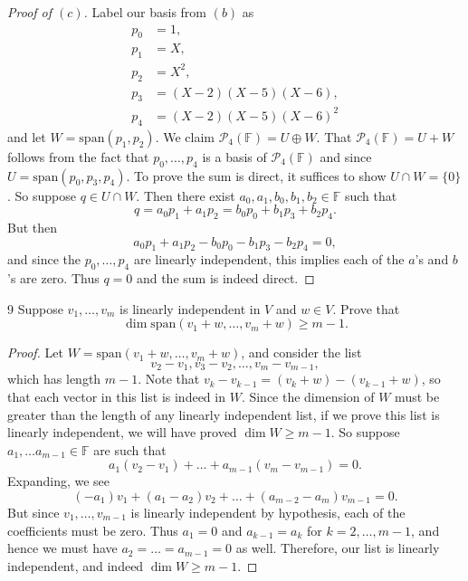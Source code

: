 \documentclass{extarticle}
\newenvironment{problem}[1]{\begin{prob*}{#1}{}}{\end{prob*}}
\newcommand{\F}{\mathbb{F}}
\newcommand{\Span}{\mathrm{span}}
\begin{document}
\begin{proof}[Proof of $(c)$]
Label our basis from $(b)$ as
\begin{align*}
p_0 &= 1, \\ p_1 &= X,\\ p_2 &= X^2,\\ p_3 &= (X - 2)(X-5)(X-6), \\ p_4 &= (X-2)(X-5)(X-6)^2
\end{align*}
and let $W = \Span(p_1, p_2)$.  We claim $\mathcal{P}_4(\F) = U\oplus W$.  That $\mathcal{P}_4(\F) = U + W$ follows from the fact that $p_0,\dots, p_4$ is a basis of $\mathcal{P}_4(\F)$ and since $U = \Span(p_0, p_3, p_4)$.  To prove the sum is direct, it suffices to show $U\cap W=\{0\}$.  So suppose $q\in U\cap W$.  Then there exist $a_0, a_1, b_0, b_1, b_2\in\F$ such that 
\begin{equation*}
q = a_0p_1 + a_1 p_2 = b_0p_0 + b_1 p_3 + b_2 p_4.
\end{equation*}
But then
\begin{equation*}
a_0p_1 + a_1 p_2 - b_0p_0 - b_1 p_3 - b_2 p_4 = 0,
\end{equation*}
and since the $p_0,\dots,p_4$ are linearly independent, this implies each of the $a$'s and $b$'s are zero.  Thus $q=0$ and the sum is indeed direct.
\end{proof}

\begin{problem}{9}
Suppose $v_1,\dots, v_m$ is linearly independent in $V$ and $w\in V$.  Prove that 
\begin{equation*}
\dim\Span(v_1 + w, \dots, v_m + w)\geq m - 1.
\end{equation*}
\end{problem}
\begin{proof}
Let $W = \Span(v_1 + w, \dots, v_m + w)$, and consider the list
\begin{equation*}
v_2 - v_1, v_3 - v_2,\dots, v_m - v_{m-1},
\end{equation*}
which has length $m - 1$.  Note that $v_k - v_{k - 1} = (v_k + w) - (v_{k - 1} + w)$, so that each vector in this list is indeed in $W$.  Since the dimension of $W$ must be greater than the length of any linearly independent list, if we prove this list is linearly independent, we will have proved $\dim W\geq m - 1$.  So suppose $a_1,\dots a_{m - 1}\in\F$ are such that 
\begin{equation*}
a_1(v_2 - v_1) + \dots + a_{m-1}(v_m - v_{m-1}) = 0.
\end{equation*}
Expanding, we see
\begin{equation*}
(-a_1)v_1 + (a_1 - a_2)v_2 + \dots + (a_{m-2} - a_m)v_{m-1} = 0.
\end{equation*}
But since $v_1,\dots,v_{m-1}$ is linearly independent by hypothesis, each of the coefficients must be zero.  Thus $a_1 = 0$ and $a_{k-1} = a_{k}$ for $k = 2, \dots, m- 1$, and hence we must have $a_2=\dots = a_{m-1}=0$ as well.  Therefore, our list is linearly independent, and indeed $\dim W \geq m-1$.
\end{proof}
\end{document}
